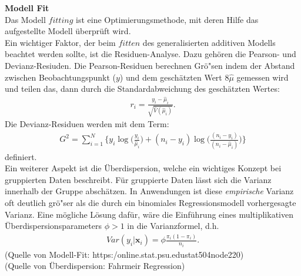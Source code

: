 \documentclass[12pt]{scrreprt}
\begin{document}
\textbf{Modell Fit} \\
Das Modell $fitting$ ist eine Optimierungsmethode, mit deren Hilfe das aufgestellte Modell überprüft wird.\\ 
Ein wichtiger Faktor, der beim $fitten$ des generalisierten additiven Modells beachtet werden sollte, ist die Residuen-Analyse. Dazu gehören die Pearson- und Devianz-Resiuden. Die Pearson-Residuen berechnen Grö"sen indem der Abstand zwischen Beobachtungspunkt ($y$) und dem geschätzten Wert 8$\hat\mu$ gemessen wird und teilen das, dann durch die Standardabweichung des geschätzten Wertes:
\begin{align}
r_{i}=\frac{y_{i}-\hat\mu_{i}}{\sqrt{\hat V(\hat\mu_{i})}}.
\end{align}
Die Devianz-Residuen werden mit dem Term:
\begin{align}
G^2=\sum_{i=1}^N\bigg\{y_{i}\log\bigg(\frac{y_{i}}{\hat\mu_{i}}\bigg)+(n_{i}-y_{i})\log\bigg(\frac{(n_{i}-y_{i})}{(n_{i}-\hat\mu_{i})}\bigg) \bigg\}
\end{align}
definiert. \\
Ein weiterer Aspekt ist die Überdispersion, welche ein wichtiges Konzept bei gruppierten Daten beschreibt. Für gruppierte Daten lässt sich die Varianz innerhalb der Gruppe abschätzen. In Anwendungen ist diese \textit{empirische} Varianz oft deutlich grö"ser als die durch ein binomiales Regressionsmodell vorhergesagte Varianz. Eine mögliche Lösung dafür, wäre die Einführung eines multiplikativen Überdispersionsparameters $\phi > 1$ in die Varianzformel, d.h.
\begin{align}
Var(y_{i}|\textbf{x}_{i})=\phi \frac{\pi_{i}(1-\pi_{i})}{n_{i}}.
\end{align}
(Quelle von Modell-Fit: https:\//online.stat.psu.edu\/stat504\/node\/220\/) \\
(Quelle von Überdispersion: Fahrmeir Regression)
\end{document}
